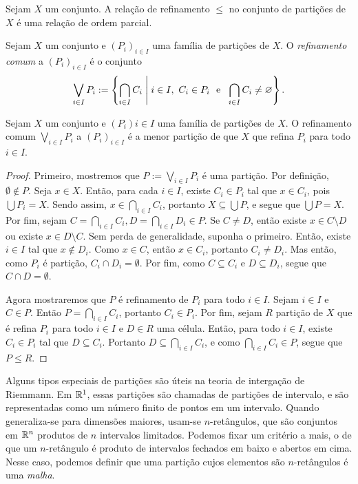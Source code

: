 \begin{prop}
Sejam $X$ um conjunto. A relação de refinamento $\leq$ no conjunto de partições de $X$ é uma relação de ordem parcial.
\end{prop}

\begin{defi}
Sejam $X$ um conjunto e $(P_i)_{i \in I}$ uma família de partições de $X$. O \emph{refinamento comum} a $(P_i)_{i \in I}$ é o conjunto
	\begin{equation*}
	\bigvee_{i \in I} P_i := \left\{\bigcap_{i \in I} C_i \;\middle\vert\; i \in I,\  C_i \in P_i \text{\ \ e\ \ } \bigcap_{i \in I} C_i \neq \varnothing \right\}.
	\end{equation*}
\end{defi}

\begin{prop}
Sejam $X$ um conjunto e $(P_i){i \in I}$ uma família de partições de $X$. O refinamento comum $\bigvee_{i \in I} P_i$ a $(P_i)_{i \in I}$ é a menor partição de que $X$ que refina $P_i$ para todo $i \in I$.
\end{prop}
\begin{proof}
Primeiro, mostremos que $P := \bigvee_{i \in I} P_i$ é uma partição. Por definição, $\emptyset \notin P$. Seja $x \in X$. Então, para cada $i \in I$, existe $C_i \in P_i$ tal que $x \in C_i$, pois $\bigcup P_i = X$. Sendo assim, $x \in \bigcap_{i \in I} C_i$, portanto $X \subseteq \bigcup P$, e segue que $\bigcup P = X$. Por fim, sejam $C=\bigcap_{i \in I} C_i, D=\bigcap_{i \in I} D_i \in P$. Se $C \neq D$, então existe $x \in C\setminus D$ ou existe $x \in D \setminus C$. Sem perda de generalidade, suponha o primeiro. Então, existe $i \in I$ tal que $x \notin D_i$. Como $x \in C$, então $x \in C_i$, portanto $C_i \neq D_i$. Mas então, como $P_i$ é partição, $C_i \cap D_i = \emptyset$. Por fim, como $C \subseteq C_i$ e $D \subseteq D_i$, segue que $C \cap D = \emptyset$.

Agora mostraremos que $P$ é refinamento de $P_i$ para todo $i \in I$. Sejam $i \in I$ e $C \in P$. Então $P=\bigcap_{i \in I} C_i$, portanto $C_i \in P_i$. Por fim, sejam $R$ partição de $X$ que é refina $P_i$ para todo $i \in I$ e $D \in R$ uma célula. Então, para todo $i \in I$, existe $C_i \in P_i$ tal que $D \subseteq C_i$. Portanto $D \subseteq \bigcap_{i \in I} C_i$, e como $\bigcap_{i \in I} C_i \in P$, segue que $P \leq R$.
\end{proof}

Alguns tipos especiais de partições são úteis na teoria de intergação de Riemmann. Em $\mathbb{R}^1$, essas partições são chamadas de partições de intervalo, e são representadas como um número finito de pontos em um intervalo. Quando generaliza-se para dimensões maiores, usam-se $n$-retângulos, que são conjuntos em $\mathbb{R}^n$ produtos de $n$ intervalos limitados. Podemos fixar um critério a mais, o de que um $n$-retângulo é produto de intervalos fechados em baixo e abertos em cima. Nesse caso, podemos definir que uma partição cujos elementos são $n$-retângulos é uma \emph{malha}.


